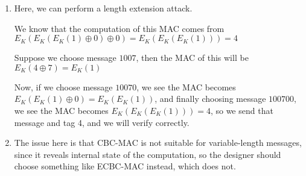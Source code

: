 \begin{enumerate}[label=(\alph*)]
\begin{enumerate}[label=(\roman*)]
        \end{enumerate}

    \item
        Here, we can perform a length extension attack.

        We know that the computation of this MAC comes from $E_K(E_K(E_K(1) \oplus 0) \oplus 0)= E_K(E_K(E_K(1))) = 4$

        Suppose we choose message $1007$, then the MAC of this will be $E_K(4 \oplus 7) = E_K(1)$

        Now, if we choose message $10070$, we see the MAC becomes $E_K(E_K(1) \oplus 0) = E_K(E_K(1))$, and finally choosing message $100700$, we see the MAC becomes $E_K(E_K(E_K(1))) = 4$, so we send that message and tag 4, and we will verify correctly.

    \item
        The issue here is that CBC-MAC is not suitable for variable-length messages, since it reveals internal state of the computation, so the designer should choose something like ECBC-MAC instead, which does not.


        
    \end{enumerate}

